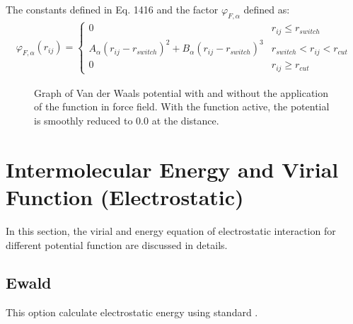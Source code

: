 \documentclass[letterpaper,10pt,english]{sphinxmanual}
\begin{document}
\begin{description}
\begin{equation*}
\end{equation*}
The constants defined in Eq. 14\sphinxhyphen{}16 and the factor \(\varphi_{F, \alpha}\) defined as:
\begin{equation*}
\begin{split}\varphi_{F, \alpha}(r_{ij}) =
\begin{cases}
  0 & r_{ij} \leq r_{switch} \\
  A_{\alpha} (r_{ij} - r_{switch})^2 + B_{\alpha} (r_{ij} - r_{switch})^3 & r_{switch} < r_{ij} < r_{cut} \\
  0 & r_{ij} \geq r_{cut}
\end{cases}\end{split}
\end{equation*}
\begin{figure}[htbp]
\centering
\capstart

\noindent{}
\caption{Graph of Van der Waals potential with and without the application of the  function in  force field. With the  function active, the potential is smoothly reduced to 0.0 at the  distance.}\label{\detokenize{vdw_energy:id4}}\end{figure}

\end{description}


\chapter{Intermolecular Energy and Virial Function (Electrostatic)}
\label{\detokenize{electrostatic:intermolecular-energy-and-virial-function-electrostatic}}\label{\detokenize{electrostatic::doc}}
In this section, the virial and energy equation of electrostatic interaction for different potential function are discussed in details.


\section{Ewald}
\label{\detokenize{electrostatic:ewald}}
This option calculate electrostatic energy using standard .
\end{document}
